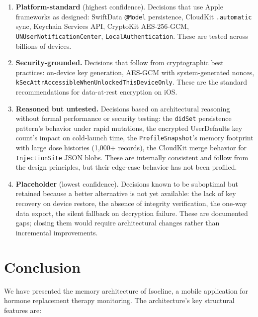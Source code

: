 \documentclass[11pt,a4paper]{article}
\newcommand{\code}[1]{\texttt{\small #1}}
\begin{document}
\begin{enumerate}[nosep,leftmargin=1.4em]
\item \textbf{Platform-standard} (highest confidence). Decisions that use
  Apple frameworks as designed: SwiftData \code{@Model} persistence,
  CloudKit \code{.automatic} sync, Keychain Services API,
  CryptoKit AES-256-GCM, \code{UNUserNotificationCenter},
  \code{LocalAuthentication}. These are tested across billions of devices.
\item \textbf{Security-grounded.} Decisions that follow from cryptographic
  best practices: on-device key generation, AES-GCM with system-generated
  nonces, \code{kSecAttrAccessibleWhenUnlockedThisDeviceOnly}. These are
  the standard recommendations for data-at-rest encryption on iOS.
\item \textbf{Reasoned but untested.} Decisions based on architectural
  reasoning without formal performance or security testing: the
  \code{didSet} persistence pattern's behavior under rapid mutations, the
  encrypted UserDefaults key count's impact on cold-launch time, the
  \code{ProfileSnapshot}'s memory footprint with large dose histories
  (1,000+ records), the CloudKit merge behavior for
  \code{InjectionSite} JSON blobs. These are internally consistent and
  follow from the design principles, but their edge-case behavior has not
  been profiled.
\item \textbf{Placeholder} (lowest confidence). Decisions known to be
  suboptimal but retained because a better alternative is not yet available:
  the lack of key recovery on device restore, the absence of integrity
  verification, the one-way data export, the silent fallback on decryption
  failure. These are documented gaps; closing them would require
  architectural changes rather than incremental improvements.
\end{enumerate}

\section{Conclusion}
\label{sec:conclusion}

We have presented the memory architecture of Isocline, a mobile application for
hormone replacement therapy monitoring. The architecture's key structural
features are:
\end{document}
